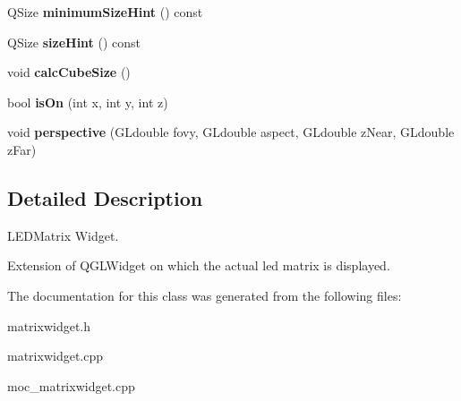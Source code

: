 \begin{DoxyCompactItemize}
\item 
\hypertarget{class_matrix_widget_a1b5864e74270c9ec65366f7a2874b90f}{Q\+Size {\bfseries minimum\+Size\+Hint} () const }\label{class_matrix_widget_a1b5864e74270c9ec65366f7a2874b90f}

\item 
\hypertarget{class_matrix_widget_a251e1b90629607fb142d969abbf1ae08}{Q\+Size {\bfseries size\+Hint} () const }\label{class_matrix_widget_a251e1b90629607fb142d969abbf1ae08}

\item 
\hypertarget{class_matrix_widget_a80dca609ac4fe46d5bb1b40f20d04c61}{void {\bfseries calc\+Cube\+Size} ()}\label{class_matrix_widget_a80dca609ac4fe46d5bb1b40f20d04c61}

\item 
\hypertarget{class_matrix_widget_a07494e16ed8ac47a925070fd80b567a6}{bool {\bfseries is\+On} (int x, int y, int z)}\label{class_matrix_widget_a07494e16ed8ac47a925070fd80b567a6}

\item 
\hypertarget{class_matrix_widget_a5fcea4d4e96684f5d84c55bd1d6dea4b}{void {\bfseries perspective} (G\+Ldouble fovy, G\+Ldouble aspect, G\+Ldouble z\+Near, G\+Ldouble z\+Far)}\label{class_matrix_widget_a5fcea4d4e96684f5d84c55bd1d6dea4b}

\end{DoxyCompactItemize}


\subsection{Detailed Description}
L\+E\+D\+Matrix Widget. 

Extension of Q\+G\+L\+Widget on which the actual led matrix is displayed. 

The documentation for this class was generated from the following files\+:\begin{DoxyCompactItemize}
\item 
matrixwidget.\+h\item 
matrixwidget.\+cpp\item 
moc\+\_\+matrixwidget.\+cpp\end{DoxyCompactItemize}
